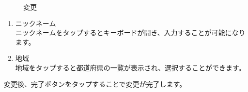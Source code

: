 \documentclass[a4j]{jarticle}
\begin{document}
\begin{figure}[H]
  \begin{center}
    \caption {変更}
    \label{change}
  \end{center}
\end{figure}

\begin{enumerate}
  \renewcommand{\labelenumi}{\textcircled{\scriptsize \theenumi}}
\item ニックネーム\\
  ニックネームをタップするとキーボードが開き、入力することが可能になります。
\item 地域\\
  地域をタップすると都道府県の一覧が表示され、選択することができます。
\end{enumerate}

変更後、完了ボタンをタップすることで変更が完了します。
\end{document}

